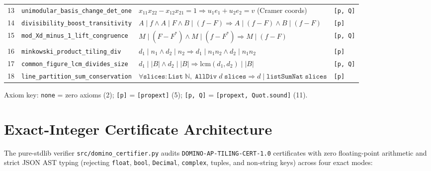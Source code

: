 \documentclass[11pt,twocolumn]{article}
\newcommand{\NN}{\mathbb{N}}
\begin{document}
\begin{table}[t]
\begin{tabular}{@{}rlll@{}}
13 & \texttt{unimodular\_basis\_change\_det\_one} & $x_{11}x_{22}-x_{12}x_{21}=1 \Rightarrow u_1 e_1 + u_2 e_2 = v$ (Cramer coords) & \texttt{[p, Q]} \\
14 & \texttt{divisibility\_boost\_transitivity} & $A\mid f \land A\mid F \land B\mid(f{-}F) \Rightarrow A\mid(f{-}F) \land B\mid(f{-}F)$ & \texttt{[p]} \\
15 & \texttt{mod\_Xd\_minus\_1\_lift\_congruence} & $M\mid(F{-}F^*) \land M\mid(f{-}F^*) \Rightarrow M\mid(f{-}F)$ & \texttt{[p, Q]} \\
16 & \texttt{minkowski\_product\_tiling\_div} & $d_1\mid n_1 \land d_2\mid n_2 \Rightarrow d_1\mid n_1 n_2 \land d_2\mid n_1 n_2$ & \texttt{[p]} \\
17 & \texttt{common\_figure\_lcm\_divides\_size} & $d_1\mid |B| \land d_2\mid |B| \Rightarrow \mathrm{lcm}(d_1,d_2)\mid |B|$ & \texttt{[p, Q]} \\
18 & \texttt{line\_partition\_sum\_conservation} & $\forall \texttt{slices}:\texttt{List}\;\NN,\; \texttt{AllDiv}\;d\;\texttt{slices} \Rightarrow d\mid \texttt{listSumNat}\;\texttt{slices}$ & \texttt{[p]} \\
\bottomrule
\end{tabular}
\vspace{-0.3em}
\begin{flushleft}
\tiny Axiom key: \texttt{none} = zero axioms (2); \texttt{[p]} = \texttt{[propext]} (5); \texttt{[p, Q]} = \texttt{[propext, Quot.sound]} (11).
\end{flushleft}
\vspace{-0.6em}
\end{table}

\section{Exact-Integer Certificate Architecture}\label{sec:certifier}
The pure-stdlib verifier \texttt{src/domino\_certifier.py} audits \texttt{DOMINO-AP-TILING-CERT-1.0} certificates with zero floating-point arithmetic and strict JSON AST typing (rejecting \texttt{float}, \texttt{bool}, \texttt{Decimal}, \texttt{complex}, tuples, and non-string keys) across four exact modes:
\end{document}
